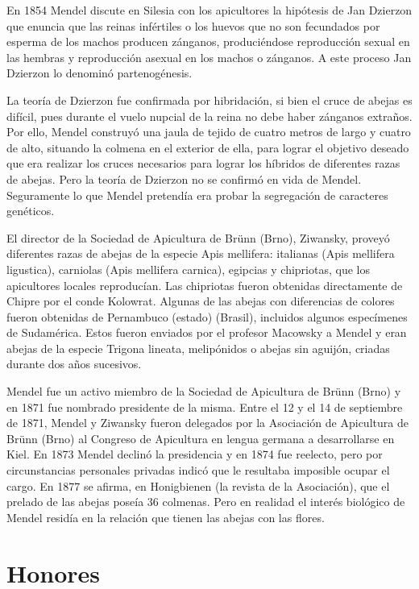 \documentclass{report}
\begin{document}
En 1854 Mendel discute en Silesia con los apicultores la hipótesis de Jan Dzierzon que enuncia que las reinas infértiles o los huevos que no son fecundados por esperma de los machos producen zánganos, produciéndose reproducción sexual en las hembras y reproducción asexual en los machos o zánganos. A este proceso Jan Dzierzon lo denominó partenogénesis.

La teoría de Dzierzon fue confirmada por hibridación, si bien el cruce de abejas es difícil, pues durante el vuelo nupcial de la reina no debe haber zánganos extraños. Por ello, Mendel construyó una jaula de tejido de cuatro metros de largo y cuatro de alto, situando la colmena en el exterior de ella, para lograr el objetivo deseado que era realizar los cruces necesarios para lograr los híbridos de diferentes razas de abejas. Pero la teoría de Dzierzon no se confirmó en vida de Mendel. Seguramente lo que Mendel pretendía era probar la segregación de caracteres genéticos.

El director de la Sociedad de Apicultura de Brünn (Brno), Ziwansky, proveyó diferentes razas de abejas de la especie Apis mellifera: italianas (Apis mellifera ligustica), carniolas (Apis mellifera carnica), egipcias y chipriotas, que los apicultores locales reproducían. Las chipriotas fueron obtenidas directamente de Chipre por el conde Kolowrat. Algunas de las abejas con diferencias de colores fueron obtenidas de Pernambuco (estado) (Brasil), incluidos algunos especímenes de Sudamérica. Estos fueron enviados por el profesor Macowsky a Mendel y eran abejas de la especie Trigona lineata, melipónidos o abejas sin aguijón, criadas durante dos años sucesivos.

Mendel fue un activo miembro de la Sociedad de Apicultura de Brünn (Brno) y en 1871 fue nombrado presidente de la misma. Entre el 12 y el 14 de septiembre de 1871, Mendel y Ziwansky fueron delegados por la Asociación de Apicultura de Brünn (Brno) al Congreso de Apicultura en lengua germana a desarrollarse en Kiel. En 1873 Mendel declinó la presidencia y en 1874 fue reelecto, pero por circunstancias personales privadas indicó que le resultaba imposible ocupar el cargo. En 1877 se afirma, en Honigbienen (la revista de la Asociación), que el prelado de las abejas poseía 36 colmenas. Pero en realidad el interés biológico de Mendel residía en la relación que tienen las abejas con las flores.

\chapter{Honores}
\end{document}
